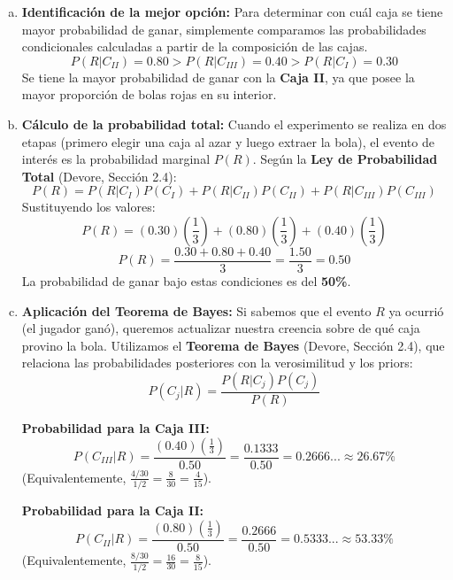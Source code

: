 \documentclass[a4paper]{article}
\begin{document}
\begin{enumerate}[a.]
    \item \textbf{Identificación de la mejor opción:}
    Para determinar con cuál caja se tiene mayor probabilidad de ganar, simplemente comparamos las probabilidades condicionales calculadas a partir de la composición de las cajas.
    $$ P(R|C_{II}) = 0.80 > P(R|C_{III}) = 0.40 > P(R|C_I) = 0.30 $$
    Se tiene la mayor probabilidad de ganar con la \textbf{Caja II}, ya que posee la mayor proporción de bolas rojas en su interior.

    \item \textbf{Cálculo de la probabilidad total:}
    Cuando el experimento se realiza en dos etapas (primero elegir una caja al azar y luego extraer la bola), el evento de interés es la probabilidad marginal $P(R)$. Según la \textbf{Ley de Probabilidad Total} (Devore, Sección 2.4):
    $$ P(R) = P(R|C_I)P(C_I) + P(R|C_{II})P(C_{II}) + P(R|C_{III})P(C_{III}) $$
    Sustituyendo los valores:
    $$ P(R) = (0.30)(\frac{1}{3}) + (0.80)(\frac{1}{3}) + (0.40)(\frac{1}{3}) $$
    $$ P(R) = \frac{0.30 + 0.80 + 0.40}{3} = \frac{1.50}{3} = 0.50 $$
    La probabilidad de ganar bajo estas condiciones es del \textbf{50\%}.

    \item \textbf{Aplicación del Teorema de Bayes:}
    Si sabemos que el evento $R$ ya ocurrió (el jugador ganó), queremos actualizar nuestra creencia sobre de qué caja provino la bola. Utilizamos el \textbf{Teorema de Bayes} (Devore, Sección 2.4), que relaciona las probabilidades posteriores con la verosimilitud y los priors:
    $$ P(C_j|R) = \frac{P(R|C_j)P(C_j)}{P(R)} $$
    
    \textbf{Probabilidad para la Caja III:}
    $$ P(C_{III}|R) = \frac{(0.40)(\frac{1}{3})}{0.50} = \frac{0.1333}{0.50} = 0.2666... \approx 26.67\% $$
    (Equivalentemente, $\frac{4/30}{1/2} = \frac{8}{30} = \frac{4}{15}$).

    \textbf{Probabilidad para la Caja II:}
    $$ P(C_{II}|R) = \frac{(0.80)(\frac{1}{3})}{0.50} = \frac{0.2666}{0.50} = 0.5333... \approx 53.33\% $$
    (Equivalentemente, $\frac{8/30}{1/2} = \frac{16}{30} = \frac{8}{15}$).
\end{enumerate}
\end{document}
